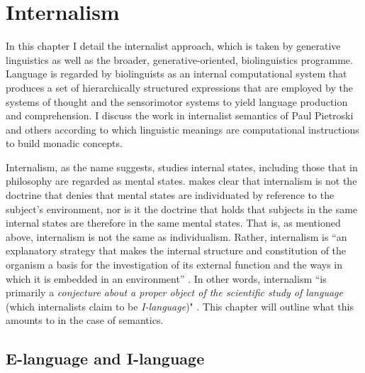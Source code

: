 \chapter{Internalism}

In this chapter I detail the internalist approach, which is taken by generative linguistics as well as the broader, generative-oriented, biolinguistics programme. Language is regarded by biolinguists as an internal computational system that produces a set of hierarchically structured expressions that are employed by the systems of thought and the sensorimotor systems to yield language production and comprehension. I discuss the work in internalist semantics of Paul Pietroski and others according to which linguistic meanings are computational instructions to build monadic concepts.

Internalism, as the name suggests, studies internal states, including those that in philosophy are regarded as mental states. \citet{Chomsky2003} makes clear that internalism is not the doctrine that denies that mental states are individuated by reference to the subject’s environment, nor is it the doctrine that holds that subjects in the same internal states are therefore in the same mental states. That is, as mentioned above, internalism is not the same as individualism. Rather, internalism is “an explanatory strategy that makes the internal structure and constitution of the organism a basis for the investigation of its external function and the ways in which it is embedded in an environment” \citep[139]{Hinzen2006}. In other words, internalism “is primarily a \textit{conjecture about a proper object of the scientific study of language }(which internalists claim to be \textit{I-language})" \citep[324, emphasis in original]{LohndalNarita2009}. This chapter will outline what this amounts to in the case of semantics.

\section{E-language and I-language}


